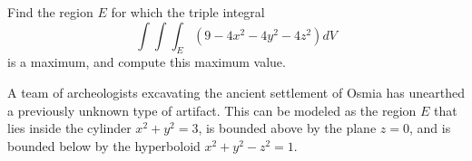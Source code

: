 \documentclass[12pt]{exam}
\begin{document}
\begin{questions}
\question Find the region $E$ for which the triple integral
    \[ \int\int\int_{E} (9 - 4x^2 - 4y^2 - 4z^2) dV \]
    is a maximum, and compute this maximum value.

\question A team of archeologists excavating the ancient settlement of Osmia has unearthed a previously unknown type of artifact. This can be modeled as the region $E$ that lies inside the cylinder $x^2 +y^2 = 3$, is bounded above by the plane $z = 0$, and is bounded below by the hyperboloid $x^2 + y^2 - z^2 = 1$.
\end{questions}
\end{document}
